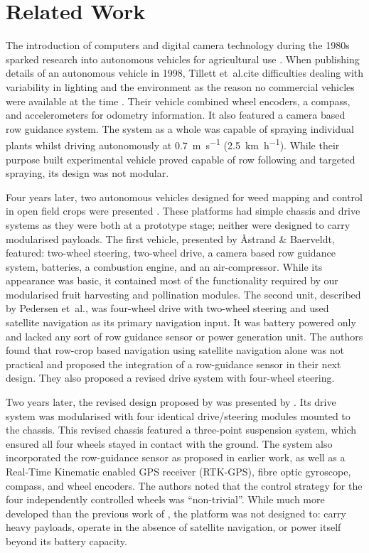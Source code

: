 \documentclass[preprint,authoryear,12pt]{elsarticle}
\begin{document}
\section{Related Work}
\label{sect:review}

        The introduction of computers and digital camera technology during the 1980s sparked research into autonomous vehicles for agricultural use \citep{Li2009}.
        When publishing details of an autonomous vehicle in 1998, Tillett et~al.\@ cite difficulties dealing with variability in lighting and the environment as the reason no commercial vehicles were available at the time \citep{Tillett1998}.
        Their vehicle combined wheel encoders, a compass, and accelerometers for odometry information.
        It also featured a camera based row guidance system.
        The system as a whole was capable of spraying individual plants whilst driving autonomously at \SI{0.7}{\meter\per\second} (\SI{2.5}{\kilo\meter\per\hour}).
        While their purpose built experimental vehicle proved capable of row following and targeted spraying, its design was not modular.

        Four years later, two autonomous vehicles designed for weed mapping and control in open field crops were presented \citep{Pedersen2002,Astrand2002}.
        These platforms had simple chassis and drive systems as they were both at a prototype stage; neither were designed to carry modularised payloads.
        The first vehicle, presented by Åstrand \& Baerveldt, featured: two-wheel steering, two-wheel drive, a camera based row guidance system, batteries, a combustion engine, and an air-compressor.
        While its appearance was basic, it contained most of the functionality required by our modularised fruit harvesting and pollination modules.
        The second unit, described by Pedersen et~al.\@, was four-wheel drive with two-wheel steering and used satellite navigation as its primary navigation input.
        It was battery powered only and lacked any sort of row guidance sensor or power generation unit.
        The authors found that row-crop based navigation using satellite navigation alone was not practical and proposed the integration of a row-guidance sensor in their next design.
        They also proposed a revised drive system with four-wheel steering.

        Two years later, the revised design proposed by \cite{Pedersen2002} was presented by \cite{Bak2004}.
        Its drive system was modularised with four identical drive/steering modules mounted to the chassis.
        This revised chassis featured a three-point suspension system, which ensured all four wheels stayed in contact with the ground.
        The system also incorporated the row-guidance sensor as proposed in earlier work, as well as a Real-Time Kinematic enabled GPS receiver (RTK-GPS), fibre optic gyroscope, compass, and wheel encoders.
        The authors noted that the control strategy for the four independently controlled wheels was ``non-trivial''.
        While much more developed than the previous work of \cite{Pedersen2002}, the platform was not designed to: carry heavy payloads, operate in the absence of satellite navigation, or power itself beyond its battery capacity.
\end{document}
